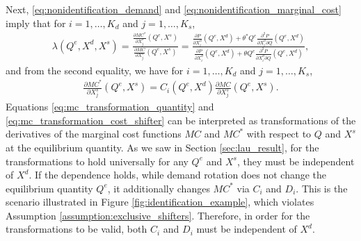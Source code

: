 \documentclass[11pt, a4paper]{article}
\theoremstyle{remark}
\begin{document}



Next, \eqref{eq:nonidentification_demand} and \eqref{eq:nonidentification_marginal_cost} imply that for $i = 1, \ldots, K_d$ and $j = 1, \ldots, K_s$,
\begin{align}
    \lambda(Q^e, X^{d}, X^{s}) =  \frac{\frac{\partial MC^{*}}{\partial X^{s}_j}(Q^e, X^{s})}{\frac{\partial MC}{\partial X^{s}_j}(Q^e, X^{s})} =  \frac{\frac{\partial P}{\partial X^{d}_i}(Q^e, X^{d}) + \theta^{*} Q^e\frac{\partial^2 P}{\partial X^{d}_{i}\partial Q}(Q^e, X^{d}) }{\frac{\partial P}{\partial X^{d}_i}(Q^e, X^{d}) + \theta Q^e\frac{\partial^2 P}{\partial X^{d}_{i}\partial Q}(Q^e, X^{d})},
\end{align}
and from the second equality, we have for $i = 1, \ldots, K_d$ and $j = 1, \ldots, K_s$,
\begin{align}
    \frac{\partial MC^{*}}{\partial X^{s}_j}(Q^e, X^{s}) = C_i(Q^e, X^{d})\frac{\partial MC}{\partial X^{s}_j}(Q^e, X^{s}).\label{eq:mc_transformation_cost_shifter}
\end{align}
Equations \eqref{eq:mc_transformation_quantity} and \eqref{eq:mc_transformation_cost_shifter}  can be interpreted as transformations of the derivatives of the marginal cost functions $MC$ and $MC^{*}$ with respect to $Q$ and $X^{s}$ at the equilibrium quantity.
As we saw in Section \ref{sec:lau_result}, for the transformations to hold universally for any $Q^e$ and $X^{s}$, they must be independent of $X^{d}$.
If the dependence holds, while demand rotation does not change the equilibrium quantity $Q^e$, it additionally changes $MC^{*}$ via $C_i$ and $D_i$.
This is the scenario illustrated in Figure \ref{fig:identification_example}, which violates Assumption \ref{assumption:exclusive_shifters}. 
Therefore, in order for the transformations to be valid, both $C_i$ and $D_i$ must be independent of $X^{d}$.
\end{document}
